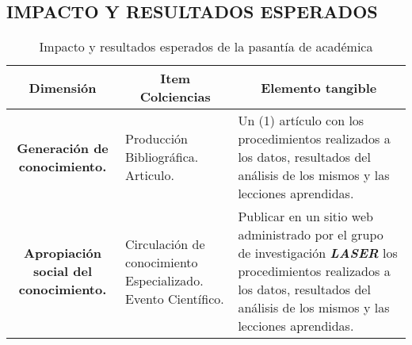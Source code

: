 \begin{center}
\section{IMPACTO Y RESULTADOS ESPERADOS}
\end{center}


\begin{table}[ht]
	\def\arraystretch{2}
	\small
	\begin{tabularx}{\linewidth}{ |X|X|X| }
		\hline
			\multicolumn{1}{|c|}{\textbf{Dimensi\'on}}&
			\multicolumn{1}{|c|}{\textbf{Item Colciencias}}&
			\multicolumn{1}{|c|}{\textbf{Elemento tangible}}\\
		\hline
			\multicolumn{1}{|c|}{\textbf{Generación de conocimiento.}}& 
			Producción Bibliográfica. Articulo.&
			Un (1) artículo con los procedimientos realizados a los datos, resultados del an\'alisis de los mismos y las lecciones aprendidas.\\
		\hline
			\multicolumn{1}{|c|}{\textbf{Apropiación social del conocimiento.}}& 
			Circulación de conocimiento Especializado. Evento Científico.&
			Publicar en un sitio web administrado por el grupo de investigaci\'on \textbf{\textit{LASER}} los procedimientos realizados a los datos, resultados del an\'alisis de los mismos y las lecciones aprendidas.\\ 
		\hline
	\end{tabularx}
	\caption{Impacto y resultados esperados de la pasant\'ia de acad\'emica}
\end{table}

